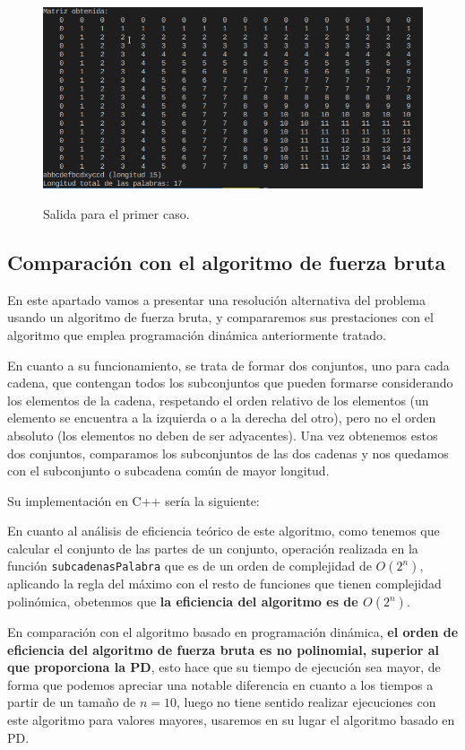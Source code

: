 \begin{figure}
  \centering
  \caption{Salida para el primer caso.}
  \includegraphics[scale=0.67]{img/LettersMatrixResult.png}
  \label{fig:1}
\end{figure}

\subsection{Comparación con el algoritmo de fuerza bruta}

En este apartado vamos a presentar una resolución alternativa del problema
usando un algoritmo de fuerza bruta, y compararemos sus prestaciones con el
algoritmo que emplea programación dinámica anteriormente tratado.

En cuanto a su funcionamiento, se trata de formar dos conjuntos, uno para cada cadena, que contengan todos los subconjuntos que pueden formarse considerando los elementos de la cadena, respetando el orden relativo de los elementos (un elemento se encuentra a la izquierda o a la derecha del otro), pero no el orden absoluto (los elementos no deben de ser adyacentes). Una vez obtenemos estos dos conjuntos, comparamos los subconjuntos de las dos cadenas y nos quedamos con el subconjunto 
o subcadena común de mayor longitud.

Su implementación en C++ sería la siguiente:



En cuanto al análisis de eficiencia teórico de este algoritmo, como tenemos que calcular el conjunto de las partes de un conjunto, operación realizada en la función 
\texttt{subcadenasPalabra} que es de un orden de complejidad de $O(2^{n})$, aplicando la regla del máximo con el resto de funciones que tienen complejidad polinómica, obetenmos que \textbf{la eficiencia del algoritmo es de $O(2^{n})$}.

En comparación con el algoritmo basado en programación dinámica, \textbf{el orden de eficiencia del algoritmo de fuerza bruta es no polinomial, superior al que proporciona la PD}, esto hace que su tiempo de ejecución sea mayor, de forma que podemos apreciar una notable diferencia en cuanto a los tiempos a partir de un 
tamaño de $n=10$, luego no tiene sentido realizar ejecuciones con este algoritmo
para valores mayores, usaremos en su lugar el algoritmo basado en PD.

